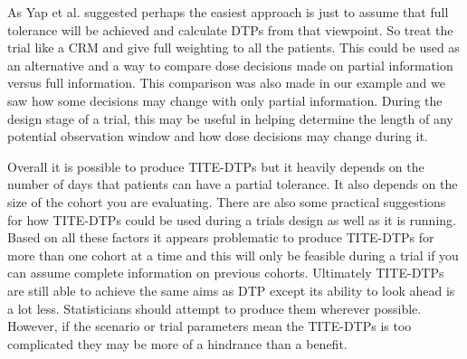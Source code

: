 As Yap et al. \cite{yapDoseTransitionPathways2017} suggested perhaps the easiest approach is just to assume that full tolerance will be achieved and calculate DTPs from that viewpoint. So treat the trial like a CRM and give full weighting to all the patients. This could be used as an alternative and a way to compare dose decisions made on partial information versus full information. This comparison was also made in our example and we saw how some decisions may change with only partial information. During the design stage of a trial, this may be useful in helping determine the length of any potential observation window and how dose decisions may change during it.  

Overall it is possible to produce TITE-DTPs but it heavily depends on the number of days that patients can have a partial tolerance. It also depends on the size of the cohort you are evaluating. There are also some practical suggestions for how TITE-DTPs could be used during a trials design as well as it is running. Based on all these factors it appears problematic to produce TITE-DTPs for more than one cohort at a time and this will only be feasible during a trial if you can assume complete information on previous cohorts. Ultimately TITE-DTPs are still able to achieve the same aims as DTP except its ability to look ahead is a lot less. Statisticians should attempt to produce them wherever possible. However, if the scenario or trial parameters mean the TITE-DTPs is too complicated they may be more of a hindrance than a benefit.